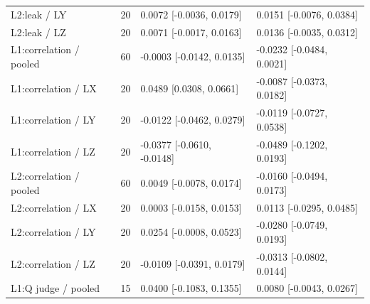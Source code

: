 \begin{longtable}{@{}p{1.8in}rl l@{}}
L2:leak / LY & 20 & 0.0072 [-0.0036, 0.0179] & 0.0151 [-0.0076, 0.0384]\\
L2:leak / LZ & 20 & 0.0071 [-0.0017, 0.0163] & 0.0136 [-0.0035, 0.0312]\\
L1:correlation / pooled & 60 & -0.0003 [-0.0142, 0.0135] & -0.0232 [-0.0484, 0.0021]\\
L1:correlation / LX & 20 & 0.0489 [0.0308, 0.0661] & -0.0087 [-0.0373, 0.0182]\\
L1:correlation / LY & 20 & -0.0122 [-0.0462, 0.0279] & -0.0119 [-0.0727, 0.0538]\\
L1:correlation / LZ & 20 & -0.0377 [-0.0610, -0.0148] & -0.0489 [-0.1202, 0.0193]\\
L2:correlation / pooled & 60 & 0.0049 [-0.0078, 0.0174] & -0.0160 [-0.0494, 0.0173]\\
L2:correlation / LX & 20 & 0.0003 [-0.0158, 0.0153] & 0.0113 [-0.0295, 0.0485]\\
L2:correlation / LY & 20 & 0.0254 [-0.0008, 0.0523] & -0.0280 [-0.0749, 0.0193]\\
L2:correlation / LZ & 20 & -0.0109 [-0.0391, 0.0179] & -0.0313 [-0.0802, 0.0144]\\
L1:Q judge / pooled & 15 & 0.0400 [-0.1083, 0.1355] & 0.0080 [-0.0043, 0.0267]\\

\end{longtable}
